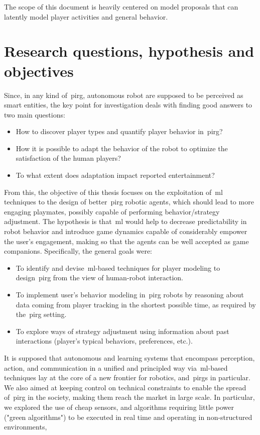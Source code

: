 The scope of this document is heavily centered on model proposals that can latently model player activities and general behavior.  %

\section{Research questions, hypothesis and objectives}	
Since, in any kind of~\gls{pirg}, autonomous robot are supposed to be perceived as smart entities, the key point for investigation deals with finding good answers to two main questions:

\begin{itemize}
\item How to discover player types and quantify player behavior in~\gls{pirg}?
\item How it is possible to adapt the behavior of the robot to optimize the satisfaction of the human players?
\item To what extent does adaptation impact reported entertainment?
\end{itemize}

From this, the objective of this thesis focuses on the exploitation of~\gls{ml} techniques to the design of better~\gls{pirg} robotic agents, which should lead to more engaging playmates, possibly capable of performing behavior/strategy adjustment. The hypothesis is that~\gls{ml} would help to decrease predictability in robot behavior and introduce game dynamics capable of considerably empower the user’s engagement, making so that the agents can be well accepted as game companions. Specifically, the general goals were:

\begin{itemize}
\item To identify and devise~\gls{ml}-based techniques for player modeling to design~\gls{pirg} from the view of human-robot interaction. %
\item To implement user's behavior modeling in~\gls{pirg} robots by reasoning about data coming from player tracking in the shortest possible time, as required by the~\gls{pirg} setting.
\item To explore ways of strategy adjustment using information about past interactions (player's typical behaviors, preferences, etc.).
\end{itemize}

It is supposed that autonomous and learning systems that encompass perception, action, and communication in a unified and principled way via~\gls{ml}-based techniques lay at the core of a new frontier for robotics, and~\gls{pirg}s in particular. 
We also aimed at keeping control on technical constraints  to enable the spread of~\gls{pirg} in the society, making them reach the market in large scale. In particular, we explored the use of cheap sensors, and algorithms requiring little power ("green algorithms") to be executed in real time and operating in non-structured environments, 

